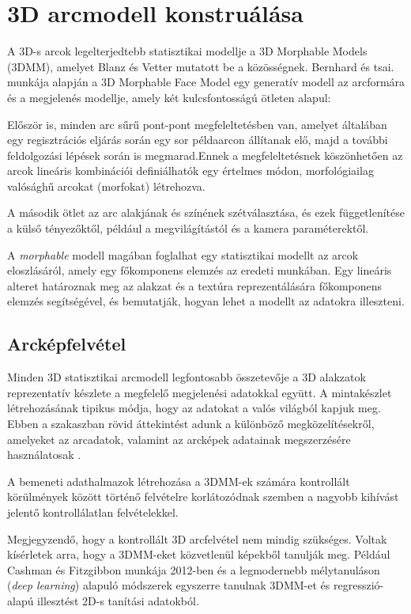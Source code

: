 \documentclass[12pt,a4]{article}
\begin{document}
 
	 \section{3D arcmodell konstruálása}
	 \label{3d}
	 \cite{survey} A 3D-s arcok legelterjedtebb statisztikai modellje a 3D Morphable Models (3DMM), amelyet Blanz és Vetter \cite{blanzvetter} mutatott be a közösségnek. Bernhard és tsai. \cite{3dmm} munkája alapján a 3D Morphable Face Model egy generatív modell az arcformára
	 és a megjelenés modellje, amely két kulcsfontosságú ötleten alapul:
	 
	  Először is, minden arc
	 sűrű pont-pont megfeleltetésben van, amelyet általában egy regisztrációs eljárás során egy sor példaarcon állítanak elő, majd
	 a további feldolgozási lépések során is megmarad.Ennek a megfeleltetésnek köszönhetően az arcok lineáris kombinációi definiálhatók egy értelmes módon, morfológiailag valósághű arcokat (morfokat) létrehozva.
	 
	 
	 A második ötlet az arc alakjának és színének szétválasztása, és ezek függetlenítése a külső tényezőktől, például a megvilágítástól és a kamera paraméterektől.
	 
	  A \textit{morphable} modell magában foglalhat egy statisztikai modellt
	 az arcok eloszlásáról, amely egy főkomponens elemzés az eredeti munkában.
  Egy lineáris
alteret határoznak meg az alakzat és a textúra reprezentálására főkomponens elemzés \cite{PCA} segítségével, és bemutatják, hogyan lehet a modellt az adatokra illeszteni. 

	 \subsection{Arcképfelvétel}
	  Minden 3D statisztikai arcmodell legfontosabb összetevője a 3D alakzatok reprezentatív készlete a megfelelő megjelenési adatokkal együtt. A mintakészlet létrehozásának tipikus módja, hogy az adatokat a valós világból kapjuk meg. Ebben a szakaszban rövid áttekintést adunk a különböző megközelítésekről, amelyeket az arcadatok, valamint az arcképek adatainak megszerzésére használatosak \cite{3dmm}.
	  
	 A bemeneti adathalmazok létrehozása a 3DMM-ek számára kontrollált körülmények között történő felvételre korlátozódnak szemben a nagyobb kihívást jelentő kontrollálatlan felvételekkel.
	 
	 Megjegyzendő, hogy a kontrollált 3D arcfelvétel nem mindig szükséges. Voltak kísérletek arra, hogy a 3DMM-eket közvetlenül képekből tanulják meg. Például Cashman és Fitzgibbon munkája 2012-ben \cite{dolphins} és a legmodernebb mélytanuláson (\textit{deep learning}) alapuló módszerek egyszerre tanulnak 3DMM-et és regresszió-alapú illesztést 2D-s tanítási adatokból.
	 
\end{document}
